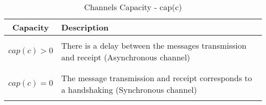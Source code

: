 \begin{table}[ht!]
	\small
	\fontsize{11}{11}\selectfont
	\centering
	\caption{Channels Capacity - cap(c)}
	\label{table:channel}
	
    \begin{tabularx}{.8\textwidth}{cX}
	\hline
		
		\textbf{Capacity}
		& \textbf{Description} \\ [1ex]
	\hline	
	
	\\$cap(c)>0$ & There is a delay  between the messages transmission and receipt (Asynchronous channel)
	\\[1ex] \\
	
	\\ $cap(c)=0$ & The message transmission and receipt corresponds to a handshaking (Synchronous channel) 
	\\[1ex] \\
	\hline
	\end{tabularx}
\end{table} 